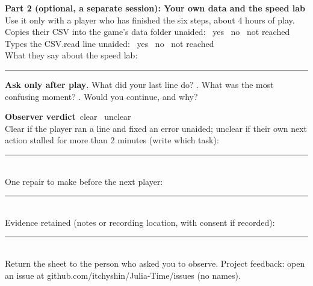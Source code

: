 \documentclass[10pt]{article}
\newcommand{\checkbox}{\fbox{\rule{0pt}{0.75em}\rule{0.75em}{0pt}}}
\begin{document}
\vspace{3pt}
\textbf{Part 2 (optional, a separate session): Your own data and the speed lab}\\
Use it only with a player who has finished the six steps, about 4 hours of play.\\
Copies their CSV into the game's data folder unaided: \checkbox\ yes \quad \checkbox\ no \quad \checkbox\ not reached\\
Types the CSV.read line unaided: \checkbox\ yes \quad \checkbox\ no \quad \checkbox\ not reached\\
What they say about the speed lab: \rule{0.65\linewidth}{0.3pt}

\vspace{3pt}
\textbf{Ask only after play}. What did your last line do? . What was the most confusing moment? . Would you continue, and why?

\vspace{3pt}
\textbf{Observer verdict}\quad \checkbox\ clear \quad \checkbox\ unclear\\
Clear if the player ran a line and fixed an error unaided; unclear if their own next action stalled for more than 2 minutes (write which task): \rule{0.12\linewidth}{0.3pt}\\
One repair to make before the next player: \rule{0.58\linewidth}{0.3pt}\\
Evidence retained (notes or recording location, with consent if recorded): \rule{0.35\linewidth}{0.3pt}\\
Return the sheet to the person who asked you to observe. Project feedback: open an issue at github.com/itchyshin/Julia-Time/issues (no names).
\end{document}
